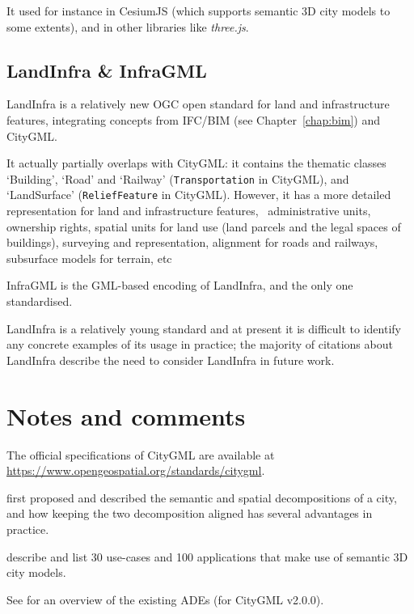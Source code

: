 It used for instance in CesiumJS (which supports semantic 3D city models to some extents), and in other libraries like \emph{three.js}.



\subsection{LandInfra \& InfraGML}

LandInfra is a relatively new OGC open standard for land and infrastructure features, integrating concepts from IFC/BIM (see Chapter~\ref{chap:bim}) and CityGML\@.

It actually partially overlaps with CityGML: it contains the thematic classes `Building', `Road' and `Railway' (\texttt{Transportation} in CityGML), and `LandSurface' (\texttt{ReliefFeature} in CityGML). 
However, it has a more detailed representation for land and infrastructure features, \eg\ administrative units, ownership rights, spatial units for land use (land parcels and the legal spaces of buildings), surveying and representation, alignment for roads and railways, subsurface models for terrain, etc

InfraGML is the GML-based encoding of LandInfra, and the only one standardised.

LandInfra is a relatively young standard and at present it is difficult to identify any concrete examples of its usage in practice; the majority of citations about LandInfra describe the need to consider LandInfra in future work.


%
\section{Notes and comments}

The official specifications of CityGML are available at \url{https://www.opengeospatial.org/standards/citygml}.


\citep{Stadler07} first proposed and described the semantic and spatial decompositions of a city, and how keeping the two decomposition aligned has several advantages in practice.

\citet{Biljecki15a} describe and list 30 use-cases and 100 applications that make use of semantic 3D city models.

See \citet{Biljecki18} for an overview of the existing ADEs (for CityGML v2.0.0).

